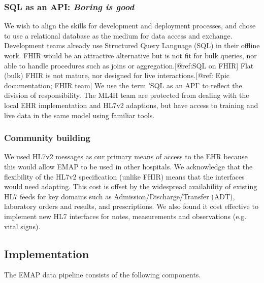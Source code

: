 \documentclass[pmlr,twocolumn,10pt]{jmlr} %
\begin{document}
\subsubsection{SQL as an API: \textit{Boring is good}}
We wish to align the skills for development and deployment processes, and chose to use a relational database as the medium for data access and exchange. Development teams already use Structured Query Language (SQL) in their offline work. FHIR would be an attractive alternative but is not fit for bulk queries, nor able to handle procedures such as joins or aggregation.[@ref:SQL on FHIR] Flat (bulk) FHIR is not mature, nor designed for live interactions.[@ref: Epic documentation; FHIR team] We use the term 'SQL as an API' to reflect the division of responsibility. The ML4H team are protected from dealing with the local EHR implementation and HL7v2 adaptions, but have access to training and live data in the same model using familiar tools.

\subsubsection{Community building}
We used HL7v2 messages as our primary means of access to the EHR because this would allow EMAP to be used in other hospitals. We acknowledge that the flexibility of the HL7v2 specification (unlike FHIR) means that the interfaces would need adapting. This cost is offset by the widespread availability of existing HL7 feeds for key domains such as Admission/Discharge/Transfer (ADT), laboratory orders and results, and prescriptions. We also found it cost effective to implement new HL7 interfaces for notes, measurements and observations (e.g. vital signs).

\subsection{Implementation}
The EMAP data pipeline consists of the following components.
\end{document}
